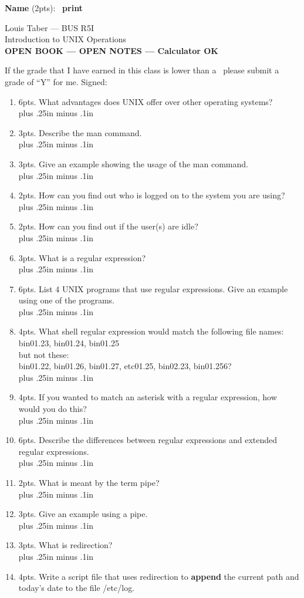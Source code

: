 \documentclass[12pt]{article}
\newcommand{\answerbox}{\fbox{\rule{0in}{.3in}\rule{3.5in}{0in}}}
\newcommand{\gradebox}{\fbox{\rule{0in}{.2in}\rule{.2in}{0in}}}
\newcommand{\signbox}{\fbox{\rule{0in}{.2in}\rule{2.5in}{0in}}}
\newcommand{\answerA}{\\ \vbox{\vskip 0.35in plus .25in minus .1in}}
\newcommand{\answerB}{\\ \vbox{\vskip 0.50in plus .25in minus .1in}}
\newcommand{\answerC}{\\ \vbox{\vskip 0.75in plus .25in minus .1in}}
\newcommand{\answerD}{\\ \vbox{\vskip 1.00in plus .25in minus .1in}}
\begin{document}
{\bf Name} (2pts):  \answerbox\ {\bf print}\hfil

Louis Taber --- BUS R5I\\
Introduction to UNIX Operations\\ 
{\bf OPEN BOOK --- OPEN NOTES --- Calculator OK}

If the grade that I have earned in this class is lower than a \gradebox\
please submit a grade of ``Y'' for me.
Signed: \signbox\hfil
%
%
\begin{enumerate}
\item  6pts.  What advantages does UNIX offer over other operating systems?
\answerD
\item  3pts.  Describe the man command.
\answerC
\item  3pts.  Give an example showing the usage of the man command.
\answerA
\item  2pts.  How can you find out who is logged on to the system you are using?
\answerA
\item  2pts.  How can you find out if the user(s) are idle?
\answerA
\item  3pts.  What is a regular expression?
\answerC
\item  6pts.  List 4 UNIX programs that use regular expressions.  
              Give an example using one of the programs.
\answerC
\item  4pts.  What shell regular expression would match 
              the following file names:\\
              bin01.23, bin01.24, bin01.25\\
              but not these:\\
              bin01.22, bin01.26, bin01.27, etc01.25, bin02.23, bin01.256?
\answerA
\item  4pts.  If you wanted to match an asterisk with a regular expression, how
              would you do this?
\answerA
\item  6pts.  Describe the differences between regular expressions and extended
              regular expressions.
\answerB
\item  2pts.  What is meant by the term pipe?
\answerC
\item  3pts.  Give an example using a pipe.
\answerA
\item  3pts.  What is redirection?
\answerC
\item  4pts.  Write a script file that uses redirection 
              to {\bf append} the current path
              and today's date to the file /etc/log.

\end{enumerate}
\end{document}
